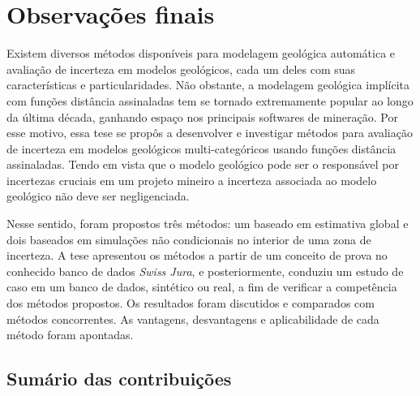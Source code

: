 \chapter{Observações finais}

Existem diversos métodos disponíveis para modelagem geológica automática e avaliação de incerteza em modelos geológicos, cada um deles com suas características e particularidades. Não obstante, a modelagem geológica implícita com funções distância assinaladas tem se tornado extremamente popular ao longo da última década, ganhando espaço nos principais softwares de mineração. Por esse motivo, essa tese se propôs a desenvolver e investigar métodos para avaliação de incerteza em modelos geológicos multi-categóricos usando funções distância assinaladas. Tendo em vista que o modelo geológico pode ser o responsável por incertezas cruciais em um projeto mineiro a incerteza associada ao modelo geológico não deve ser negligenciada.

Nesse sentido, foram propostos três métodos: um baseado em estimativa global e dois baseados em simulações não condicionais no interior de uma zona de incerteza. A tese apresentou os métodos a partir de um conceito de prova no conhecido banco de dados \textit{Swiss Jura}, e posteriormente, conduziu um estudo de caso em um banco de dados, sintético ou real, a fim de verificar a competência dos métodos propostos. Os resultados foram discutidos e comparados com métodos concorrentes. As vantagens, desvantagens e aplicabilidade de cada método foram apontadas.

\section{Sumário das contribuições}

